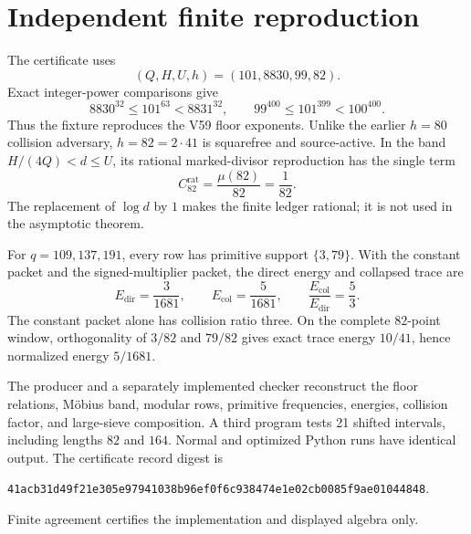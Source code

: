\section{Independent finite reproduction}

The certificate uses
\[
 (Q,H,U,h)=(101,8830,99,82).
\]
Exact integer-power comparisons give
\[
 8830^{32}\le101^{63}<8831^{32},\qquad
 99^{400}\le101^{399}<100^{400}.
\]
Thus the fixture reproduces the V59 floor exponents.  Unlike the earlier $h=80$
collision adversary, $h=82=2\cdot41$ is squarefree and source-active.  In the band
$H/(4Q)<d\le U$, its rational marked-divisor reproduction has the single term
\[
 C_{82}^{\mathrm{rat}}=\frac{\mu(82)}{82}=\frac1{82}.
\]
The replacement of $\log d$ by $1$ makes the finite ledger rational; it is not used in
the asymptotic theorem.

For $q=109,137,191$, every row has primitive support $\{3,79\}$.  With the constant
packet and the signed-multiplier packet, the direct energy and collapsed trace are
\[
 E_{\mathrm{dir}}=\frac3{1681},\qquad
 E_{\mathrm{col}}=\frac5{1681},\qquad
 \frac{E_{\mathrm{col}}}{E_{\mathrm{dir}}}=\frac53.
\]
The constant packet alone has collision ratio three.  On the complete $82$-point
window, orthogonality of $3/82$ and $79/82$ gives exact trace energy $10/41$, hence
normalized energy $5/1681$.

The producer and a separately implemented checker reconstruct the floor relations,
M\"obius band, modular rows, primitive frequencies, energies, collision factor, and
large-sieve composition.  A third program tests 21 shifted intervals, including
lengths $82$ and $164$.  Normal and optimized Python runs have identical output.  The
certificate record digest is
\begin{center}
\texttt{41acb31d49f21e305e97941038b96ef0f6c938474e1e02cb0085f9ae01044848}.
\end{center}
Finite agreement certifies the implementation and displayed algebra only.

